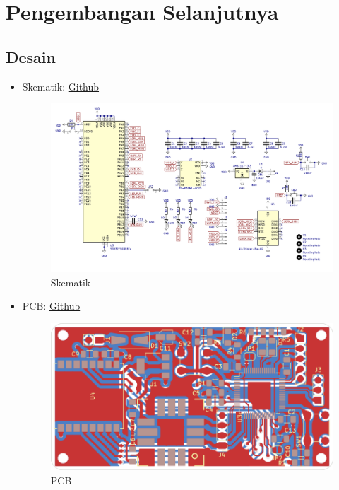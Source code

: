 \documentclass{book} %
\begin{document}
	\newpage
	\section{Pengembangan Selanjutnya}
	
	\subsection{Desain}
	
	\begin{itemize}
		\item Skematik: \href{https://github.com/VibrasticLab/wesel_monitoring/blob/master/circuit/mems_lora/mems_lora.kicad_sch}{Github}
	
		\begin{figure}[!ht]
			\centering
			\includegraphics[width=\textwidth]{images/mems_lora-sch.png}
			\caption{Skematik}
		\end{figure}
		
		\item PCB: \href{https://github.com/VibrasticLab/wesel_monitoring/blob/master/circuit/mems_lora/mems_lora.kicad_pcb}{Github}
		
		\begin{figure}[!ht]
			\centering
			\includegraphics[width=\textwidth]{images/mems_lora-brd.png}
			\caption{PCB}
		\end{figure}
		

\end{itemize}
\end{document}
